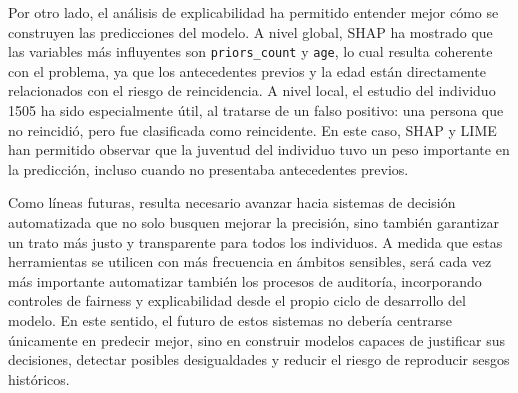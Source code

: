 \documentclass[11pt,a4paper]{article}
\begin{document}
\vspace{0.3cm}

Por otro lado, el análisis de explicabilidad ha permitido entender mejor cómo se construyen las predicciones del modelo. A nivel global, SHAP ha mostrado que las variables más influyentes son \texttt{priors\_count} y \texttt{age}, lo cual resulta coherente con el problema, ya que los antecedentes previos y la edad están directamente relacionados con el riesgo de reincidencia. A nivel local, el estudio del individuo 1505 ha sido especialmente útil, al tratarse de un falso positivo: una persona que no reincidió, pero fue clasificada como reincidente. En este caso, SHAP y LIME han permitido observar que la juventud del individuo tuvo un peso importante en la predicción, incluso cuando no presentaba antecedentes previos.

\vspace{0.3cm}

Como líneas futuras, resulta necesario avanzar hacia sistemas de decisión automatizada que no solo busquen mejorar la precisión, sino también garantizar un trato más justo y transparente para todos los individuos. A medida que estas herramientas se utilicen con más frecuencia en ámbitos sensibles, será cada vez más importante automatizar también los procesos de auditoría, incorporando controles de fairness y explicabilidad desde el propio ciclo de desarrollo del modelo. En este sentido, el futuro de estos sistemas no debería centrarse únicamente en predecir mejor, sino en construir modelos capaces de justificar sus decisiones, detectar posibles desigualdades y reducir el riesgo de reproducir sesgos históricos.

\newpage












\end{document}

